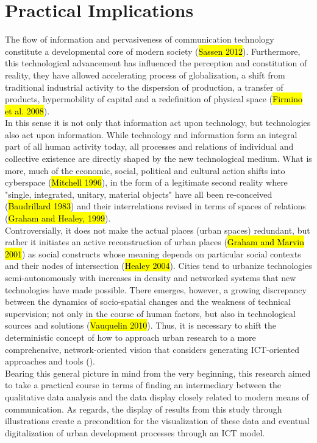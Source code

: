 \documentclass[11pt]{report}
\begin{document}
\section{Practical Implications}

The flow of information and pervasiveness of communication technology constitute a developmental core of modern society (\hl{Sassen 2012}).
Furthermore, this technological advancement has influenced the perception and constitution of reality, they have allowed accelerating process of globalization, a shift from traditional industrial activity to the dispersion of production, a transfer of products, hypermobility of capital and a redefinition of physical space (\hl{Firmino et al. 2008}). 
\\
In this sense it is not only that information act upon technology, but technologies also act upon information.
While technology and information form an integral part of all human activity today, all processes and relations of individual and collective existence are directly shaped by the new technological medium.
What is more, much of the economic, social, political and cultural action shifts into cyberspace (\hl{Mitchell 1996}), in the form of a legitimate second reality where "single, integrated, unitary, material objects" have all been re-conceived (\hl{Baudrillard 1983})  and their interrelations revised in terms of spaces of relations (\hl{Graham and Healey, 1999}).
\\
Controversially, it does not make the actual places (urban spaces) redundant, but rather it initiates an active reconstruction of urban places (\hl{Graham and Marvin 2001}) as social constructs whose meaning depends on particular social contexts and their nodes of intersection (\hl{Healey 2004}). 
Cities tend to urbanize technologies semi-autonomously with increases in density and networked systems that new technologies have made possible.
There emerges, however, a growing discrepancy between the dynamics of socio-spatial changes and the weakness of technical supervision; not only in the course of human factors, but also in technological sources and solutions (\hl{Vauquelin 2010}).
Thus, it is necessary to shift the deterministic concept of how to approach urban research to a more comprehensive, network-oriented vision that considers generating ICT-oriented approaches and tools (\cite{Huang 2012}).
\\
Bearing this general picture in mind from the very beginning, this research aimed to take a practical course in terms of finding an intermediary between the qualitative data analysis and the data display closely related to modern means of communication.
As regards, the display of results from this study through illustrations create a precondition for the visualization of these data and eventual digitalization of urban development processes through an ICT model.
\end{document}
